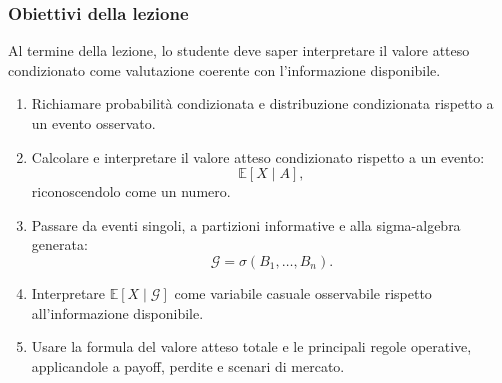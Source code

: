 \documentclass[handout]{beamer}%
\newenvironment{stepenumerate}{\begin{enumerate}[<+->]}{\end{enumerate}}
\providecommand{\E}{\mathbb{E}}
\providecommand{\G}{\mathcal{G}}
\providecommand{\1}{\mathbf{1}}
\providecommand{\QTR}[2]{\csname #1\endcsname{#2}}
\begin{document}
\begin{frame}%
%

\frametitle{Obiettivi della lezione}%
%

%


Al termine della lezione, lo studente deve saper interpretare il valore atteso
condizionato come valutazione coerente con l'informazione disponibile.

\medskip

\begin{stepenumerate}
\item[1.] Richiamare probabilit\`{a} condizionata e distribuzione condizionata
rispetto a un evento osservato.

\item[2.] Calcolare e interpretare il valore atteso condizionato rispetto a un
evento:
\[
\E[X\mid A],
\]
riconoscendolo come un numero.

\item[3.] Passare da eventi singoli, a partizioni informative e alla
sigma-algebra generata:
\[
\G=\sigma(B_{1},\ldots,B_{n}).
\]


\item[4.] Interpretare $\E[X\mid\G]$ come variabile casuale osservabile
rispetto all'informazione disponibile.

\item[5.] Usare la formula del valore atteso totale e le principali regole
operative, applicandole a payoff, perdite e scenari di mercato.
\end{stepenumerate}%

\transboxout
\end{frame}%
%
\end{document}
